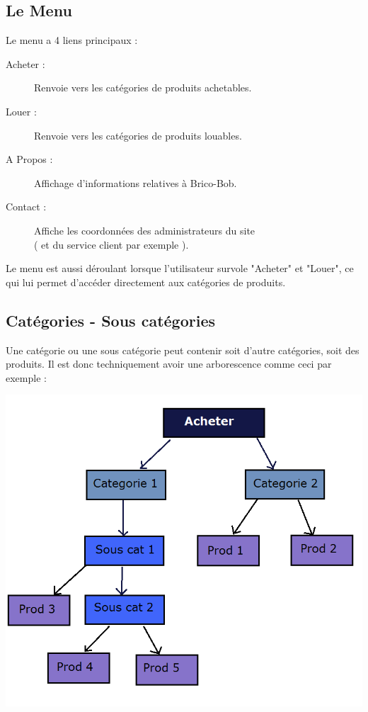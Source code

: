 \subsection{Le Menu}

	Le menu a 4 liens principaux : 
	\begin{description}
		\item[Acheter :] Renvoie vers les catégories de produits achetables.
		\item[Louer :] Renvoie vers les catégories de produits louables.
		\item[A Propos :] Affichage d'informations relatives à Brico-Bob.
		\item[Contact :] Affiche les coordonnées des administrateurs du site\\
		 ( et du service 	client par exemple ).
	\end{description}

	Le menu est aussi déroulant lorsque l'utilisateur survole "Acheter" et "Louer", 	ce qui lui permet d'accéder directement aux catégories de produits.
	
	\subsection{Catégories - Sous catégories}

	Une catégorie ou une sous catégorie peut contenir soit d'autre catégories, 	soit des produits. Il est donc techniquement avoir une arborescence comme ceci par exemple :

\includegraphics[scale=0.7]{arbocatego.png}

